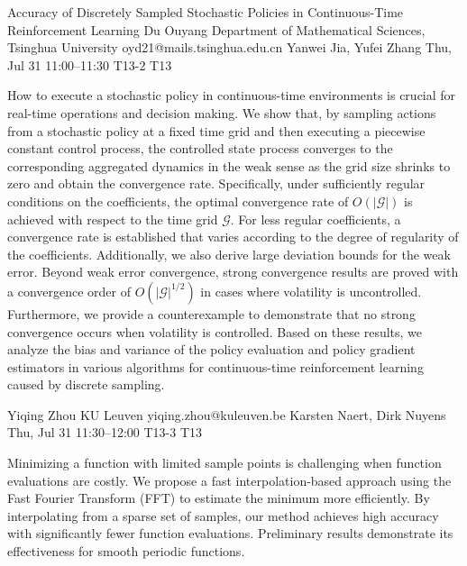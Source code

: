 \documentclass[12pt,lettersize,oneside]{book} %
\begin{document}
\begin{talk}
  {Accuracy of Discretely Sampled Stochastic Policies in Continuous-Time Reinforcement Learning}%
  {Du Ouyang}%
  {Department of Mathematical Sciences, Tsinghua University}%
  {oyd21@mails.tsinghua.edu.cn}%
  {Yanwei Jia, Yufei Zhang}%
  {}%
  {Thu, Jul 31 11:00--11:30}%
  {T13-2}%
  {T13}%
  
    
   


\medskip

How to execute a stochastic policy in continuous-time environments is crucial for real-time operations and decision making. We show that, by sampling actions from a stochastic policy at a fixed time grid and then executing a piecewise constant control process, the controlled state process converges to the corresponding aggregated dynamics in the weak sense as the grid size shrinks to zero and obtain the convergence rate. Specifically, under sufficiently regular conditions on the coefficients, the optimal convergence rate of $O(|\mathscr{G}|)$ is achieved with respect to the time grid $\mathscr{G}$. For less regular coefficients, a convergence rate is established that varies according to the degree of regularity of the coefficients. Additionally, we also derive large deviation bounds for the weak error. Beyond weak error convergence, strong convergence results are proved with a convergence order of $O(|\mathscr{G}|^{1/2})$ in cases where volatility is uncontrolled. Furthermore, we provide a counterexample to demonstrate that no strong convergence occurs when volatility is controlled. Based on these results, we analyze the bias and variance of the policy evaluation and policy gradient estimators in various algorithms for continuous-time reinforcement learning caused by discrete sampling.


\end{talk}

\begin{talk}
  {Yiqing Zhou}%
  {KU Leuven}%
  {yiqing.zhou@kuleuven.be}%
  {Karsten Naert, Dirk Nuyens}%
  {}%
  {}%
  {Thu, Jul 31 11:30--12:00}%
  {T13-3}%
  {T13}%
  
    
   
Minimizing a function with limited sample points is challenging when function evaluations are costly. We propose a fast interpolation-based approach using the Fast Fourier Transform (FFT) to estimate the minimum more efficiently. By interpolating from a sparse set of samples, our method achieves high accuracy with significantly fewer function evaluations. Preliminary results demonstrate its effectiveness for smooth periodic functions.
\end{talk}
\end{document}
